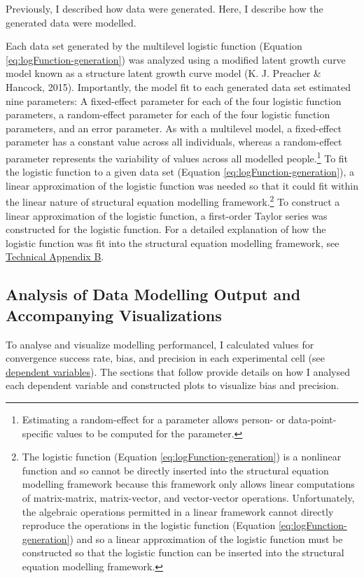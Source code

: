 \documentclass[
12pt, %
twoside,
english]{guelphthesis}
\theoremstyle{definition}
\theoremstyle{definition}
\theoremstyle{definition}
\theoremstyle{definition}
\theoremstyle{remark}
\begin{document}
Previously, I described how data were generated. Here, I describe how the generated data were modelled.

Each data set generated by the multilevel logistic function (Equation \ref{eq:logFunction-generation}) was analyzed using a modified latent growth curve model known as a structure latent growth curve model (K. J. Preacher \& Hancock, 2015). Importantly, the model fit to each generated data set estimated nine parameters: A fixed-effect parameter for each of the four logistic function parameters, a random-effect parameter for each of the four logistic function parameters, and an error parameter. As with a multilevel model, a fixed-effect parameter has a constant value across all individuals, whereas a random-effect parameter represents the variability of values across all modelled people.\footnote{Estimating a random-effect for a parameter allows person- or data-point-specific values to be computed for the parameter.} To fit the logistic function to a given data set (Equation \ref{eq:logFunction-generation}), a linear approximation of the logistic function was needed so that it could fit within the linear nature of structural equation modelling framework.\footnote{The logistic function (Equation \ref{eq:logFunction-generation}) is a nonlinear function and so cannot be directly inserted into the structural equation modelling framework because this framework only allows linear computations of matrix-matrix, matrix-vector, and vector-vector operations. Unfortunately, the algebraic operations permitted in a linear framework cannot directly reproduce the operations in the logistic function (Equation \ref{eq:logFunction-generation}) and so a linear approximation of the logistic function must be constructed so that the logistic function can be inserted into the structural equation modelling framework.} To construct a linear approximation of the logistic function, a first-order Taylor series was constructed for the logistic function. For a detailed explanation of how the logistic function was fit into the structural equation modelling framework, see \protect\hyperlink{structured-latent}{Technical Appendix B}.

\hypertarget{analysis-visualization}{%
\subsection{Analysis of Data Modelling Output and Accompanying Visualizations}\label{analysis-visualization}}

To analyse and visualize modelling performancel, I calculated values for convergence success rate, bias, and precision in each experimental cell (see \protect\hyperlink{dependent-variables}{dependent variables}). The sections that follow provide details on how I analysed each dependent variable and constructed plots to visualize bias and precision.
\end{document}
